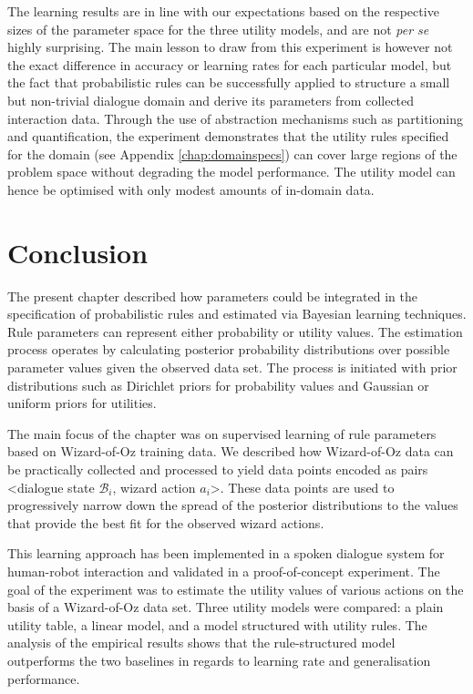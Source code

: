 The learning results are in line with our expectations based on the respective sizes of the parameter space for the three utility models, and are not \textit{per se} highly surprising.  The main lesson to draw from this experiment is however not the exact difference in accuracy or learning rates for each particular model, but the fact that probabilistic rules can be successfully applied to structure a small but non-trivial dialogue domain and derive its parameters from collected interaction data.  Through the use of abstraction mechanisms such as partitioning and quantification, the experiment demonstrates that the utility rules specified for the domain (see Appendix \ref{chap:domainspecs}) can cover large regions of the problem space without degrading the model performance.  The utility model can hence be optimised with only modest amounts of in-domain data. 


\section{Conclusion}
\label{sec:woz-conclusions}

The present chapter described how parameters could be integrated in the specification of probabilistic rules and estimated via Bayesian learning techniques.  Rule parameters can represent either probability or utility values. The estimation process operates by calculating posterior probability distributions over possible parameter values given the observed data set. The process is initiated with prior distributions such as Dirichlet priors for probability values and Gaussian or uniform priors for utilities. 

The main focus of the chapter was on supervised learning of rule parameters based on Wizard-of-Oz training data. We described how Wizard-of-Oz data can be practically collected and processed to yield data points encoded as pairs <dialogue state $\mathcal{B}_i$, wizard action $a_i$>.  
These data points are used to progressively narrow down the spread of the posterior distributions to the values that provide the best fit for the observed wizard actions. 

This learning approach has been implemented in a spoken dialogue system for human-robot interaction and validated in a proof-of-concept experiment.  The goal of the experiment was to estimate the utility values of various actions on the basis of a Wizard-of-Oz data set.  Three utility models were compared: a plain utility table, a linear model, and a model structured with utility rules. The analysis of the empirical results shows that the rule-structured model outperforms the two baselines in regards to learning rate and generalisation performance. 

